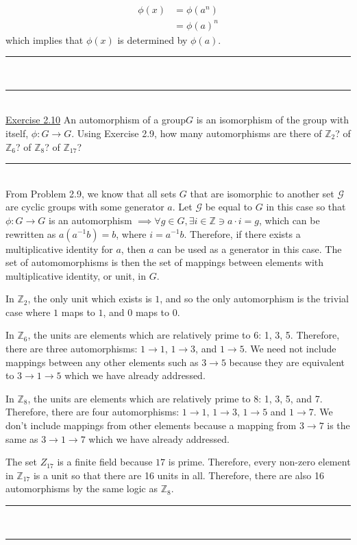 \documentclass{article}
\newcommand{\problemsep}{\leavevmode\\[0.05in] \rule[\baselineskip/4]{\textwidth}{1pt} \\[0.005in] \rule[\baselineskip]{\textwidth}{1pt}\vspace{-\baselineskip}\leavevmode\\[0.05in]}
\newcommand{\statementsep}{\leavevmode\\[0.005in] \rule[\baselineskip/4]{\textwidth}{0.4pt}\leavevmode\\[0.005in]}
\begin{document}
\begin{equation*}\begin{aligned}
	\phi(x) &= \phi(a^n) \\
          &= \phi(a)^n
\end{aligned}\end{equation*}
which implies that $\phi(x)$ is determined by $\phi(a)$.
\problemsep
\noindent\underline{Exercise 2.10}
An automorphism of a group$G$ is an isomorphism of the group with itself, $\phi: G \rightarrow G$. Using Exercise 2.9, how many automorphisms are there of $\mathbb{Z}_2$? of $\mathbb{Z}_6$? of $\mathbb{Z}_8$? of $\mathbb{Z}_{17}$?
\statementsep
From Problem 2.9, we know that all sets $G$ that are isomorphic to another set $\mathcal{G}$ are cyclic groups with some generator $a$. Let $\mathcal{G}$ be equal to $G$ in this case so that $\phi: G\rightarrow G$ is an automorphism $\implies \forall g \in G, \exists i \in \mathbb{Z} \ni a\cdot i = g$, which can be rewritten as $a(a^{-1}b) = b$, where $i = a^{-1}b$. Therefore, if there exists a multiplicative identity for $a$, then $a$ can be used as a generator in this case. The set of automomorphisms is then the set of mappings between elements with multiplicative identity, or unit, in $G$.
\par In $\mathbb{Z}_2$, the only unit which exists is $1$, and so the only automorphism is the trivial case where $1$ maps to $1$, and $0$ maps to $0$. 
\par In $\mathbb{Z}_6$, the units are elements which are relatively prime to $6$: 1, 3, 5. Therefore, there are three automorphisms: $1 \rightarrow 1$, $1 \rightarrow 3$, and $1 \rightarrow 5$. We need not include mappings between any other elements such as $3 \rightarrow 5$ because they are equivalent to $3 \rightarrow 1 \rightarrow 5$ which we have already addressed.
\par In $\mathbb{Z}_8$, the units are elements which are relatively prime to $8$: 1, 3, 5, and 7. Therefore, there are four automorphisms: $1 \rightarrow 1$, $1 \rightarrow 3$, $1 \rightarrow 5$ and $1 \rightarrow 7$. We don't include mappings from other elements because a mapping from $3 \rightarrow 7$ is the same as $3 \rightarrow 1 \rightarrow 7$ which we have already addressed.
\par The set $Z_{17}$ is a finite field because $17$ is prime. Therefore, every non-zero element in $\mathbb{Z}_{17}$ is a unit so that there are 16 units in all. Therefore, there are also 16 automorphisms by the same logic as $\mathbb{Z}_8$.
\problemsep
\end{document}
